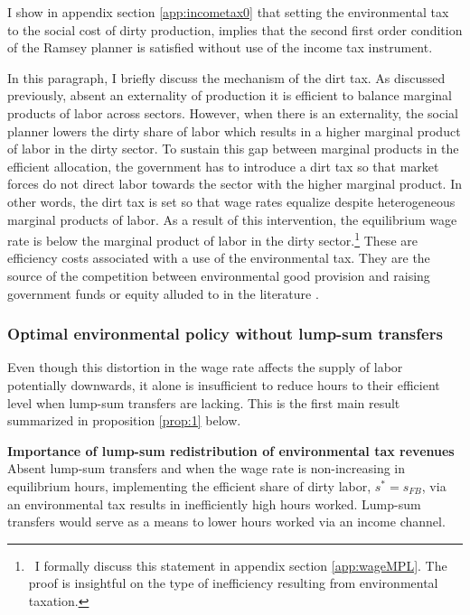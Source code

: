 I show in appendix section \ref{app:incometax0} that setting the environmental tax to the social cost of dirty production, implies that the second first order condition of the Ramsey planner is satisfied without use of the income tax instrument. %

In this paragraph, I briefly discuss the mechanism of the dirt tax.
As discussed previously, absent an externality of production it is efficient to balance marginal products of labor across sectors. However, when there is an externality, the social planner lowers the dirty share of labor which results in a higher marginal product of labor in the dirty sector. To sustain this gap between marginal products in the efficient allocation, the government has to introduce a dirt tax so that market forces do not direct labor towards the sector with the higher marginal product. In other words, the dirt tax is set so that wage rates equalize despite heterogeneous marginal products of labor. As a result of this intervention, the equilibrium wage rate is below the marginal product of labor in the dirty sector.\footnote{\ I formally discuss this statement in appendix section \ref{app:wageMPL}. The proof is insightful on the type of inefficiency resulting from environmental taxation. } These are efficiency costs associated with a use of the environmental tax. They are the source of the competition between environmental good provision and raising government funds or equity alluded to in the literature \citep{LansBovenberg1994EnvironmentalTaxation}.  

\subsubsection{Optimal environmental policy without lump-sum transfers}

Even though this distortion in the wage rate affects the supply of labor potentially downwards, it alone is insufficient to reduce hours to their efficient level when lump-sum transfers are lacking. %
This is the first main result summarized in proposition \ref{prop:1} below. 

\begin{prop}\label{prop:1}\textbf{Importance of lump-sum redistribution of environmental tax revenues}
Absent lump-sum transfers and when the  wage rate is non-increasing in equilibrium hours, 
implementing the efficient share of dirty labor, $s^*=s_{FB}$, via an environmental tax results in inefficiently high hours worked. Lump-sum transfers would serve as a means to lower hours worked via an income channel. %
\end{prop}

